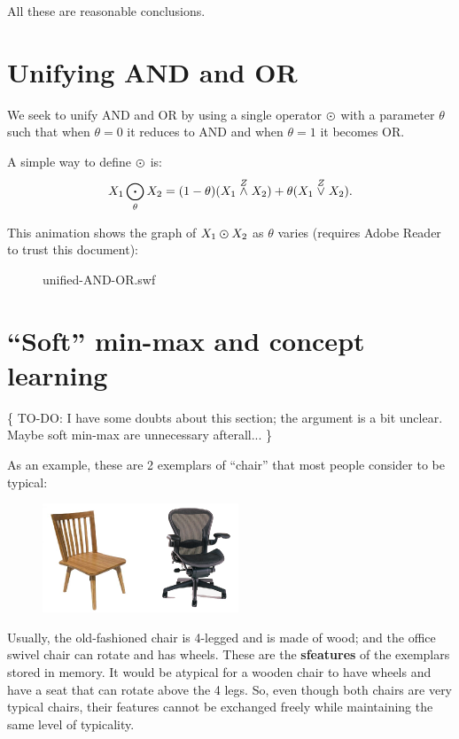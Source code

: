 All these are reasonable conclusions.

\section{Unifying AND and OR}
\label{sec:unifying-AND-and-OR}

We seek to unify AND and OR by using a single operator $\varodot$ with a parameter $\theta$ such that when $\theta = 0$ it reduces to AND and when $\theta = 1$ it becomes OR.

A simple way to define $\varodot$ is:
\begin{equation}
X_1 \bigodot_\theta X_2 = (1-\theta) (X_1 \stackrel{Z}{\wedge} X_2) + \theta (X_1 \stackrel{Z}{\vee} X_2).
\end{equation}

This animation shows the graph of $X_1 \varodot X_2$ as $\theta$ varies (requires Adobe Reader to trust this document):

\begin{figure}[H] %
{unified-AND-OR.swf}
\end{figure}

\section{``Soft'' min-max and concept learning}

\{ TO-DO:  I have some doubts about this section; the argument is a bit unclear.  Maybe soft min-max are unnecessary afterall... \}

As an example, these are 2 exemplars of ``chair'' that most people consider to be typical:
\begin{figure}[H]
\centering
\includegraphics{2-chairs.png}
\end{figure}
Usually, the old-fashioned chair is 4-legged and is made of wood; and the office swivel chair can rotate and has wheels.  These are the \textbf{sfeatures} of the exemplars stored in memory.  It would be atypical for a wooden chair to have wheels and have a seat that can rotate above the 4 legs.  So, even though both chairs are very typical chairs, their features cannot be exchanged freely while maintaining the same level of typicality.

